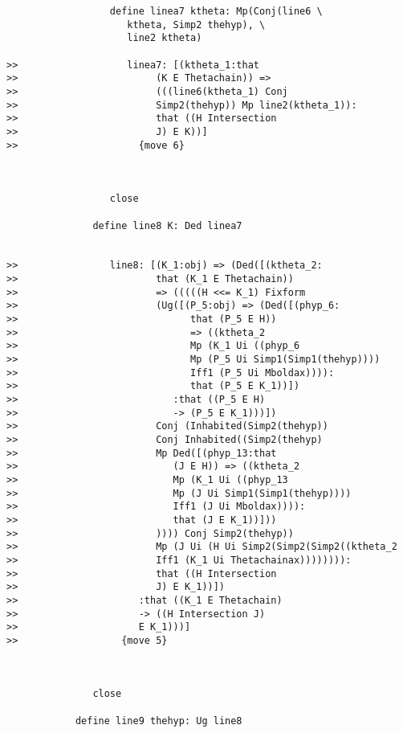 \documentclass[12pt]{article}
\begin{document}
\begin{verbatim}
                  define linea7 ktheta: Mp(Conj(line6 \
                     ktheta, Simp2 thehyp), \
                     line2 ktheta)

>>                   linea7: [(ktheta_1:that
>>                        (K E Thetachain)) =>
>>                        (((line6(ktheta_1) Conj
>>                        Simp2(thehyp)) Mp line2(ktheta_1)):
>>                        that ((H Intersection
>>                        J) E K))]
>>                     {move 6}



                  close

               define line8 K: Ded linea7


>>                line8: [(K_1:obj) => (Ded([(ktheta_2:
>>                        that (K_1 E Thetachain))
>>                        => (((((H <<= K_1) Fixform
>>                        (Ug([(P_5:obj) => (Ded([(phyp_6:
>>                              that (P_5 E H))
>>                              => ((ktheta_2
>>                              Mp (K_1 Ui ((phyp_6
>>                              Mp (P_5 Ui Simp1(Simp1(thehyp))))
>>                              Iff1 (P_5 Ui Mboldax)))):
>>                              that (P_5 E K_1))])
>>                           :that ((P_5 E H)
>>                           -> (P_5 E K_1)))])
>>                        Conj (Inhabited(Simp2(thehyp))
>>                        Conj Inhabited((Simp2(thehyp)
>>                        Mp Ded([(phyp_13:that
>>                           (J E H)) => ((ktheta_2
>>                           Mp (K_1 Ui ((phyp_13
>>                           Mp (J Ui Simp1(Simp1(thehyp))))
>>                           Iff1 (J Ui Mboldax)))):
>>                           that (J E K_1))]))
>>                        )))) Conj Simp2(thehyp))
>>                        Mp (J Ui (H Ui Simp2(Simp2(Simp2((ktheta_2
>>                        Iff1 (K_1 Ui Thetachainax)))))))):
>>                        that ((H Intersection
>>                        J) E K_1))])
>>                     :that ((K_1 E Thetachain)
>>                     -> ((H Intersection J)
>>                     E K_1)))]
>>                  {move 5}



               close

            define line9 thehyp: Ug line8



\end{verbatim}
\end{document}
